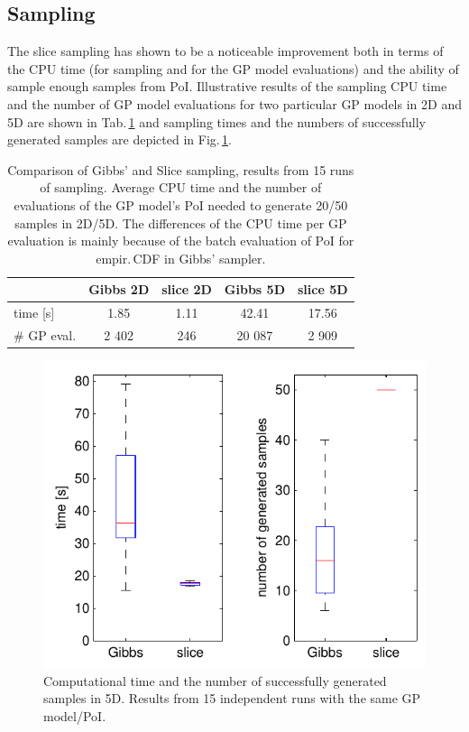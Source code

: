 \documentclass{itatnew}
\begin{document}
\subsection{Sampling}

The slice sampling has shown to be a noticeable improvement both in terms of the CPU time (for sampling and for the GP model evaluations) and the ability of sample enough samples from PoI. Illustrative results of the sampling CPU time and the number of GP model evaluations for two particular GP models in 2D and 5D are shown in Tab.\,\ref{tab:sampling} and sampling times and the numbers of successfully generated samples are depicted in Fig.\,\ref{fig:sampling}.

\begin{table}%
\begin{center}
{\small
\caption{Comparison of Gibbs' and Slice sampling, results from 15 runs of sampling. Average CPU time and the number of evaluations of the GP model's PoI needed to generate 20/50 samples in 2D/5D. The differences of the CPU time per GP evaluation is mainly because of the batch evaluation of PoI for empir.\,CDF in Gibbs' sampler.}
\vspace{1ex}
\label{tab:sampling}
\begin{tabular}{l | c c c c}
\hline
            & Gibbs 2D  & slice 2D      & Gibbs 5D      & slice 5D \\
\hline
time [s]    & 1.85      & 1.11          & 42.41         & 17.56 \\
\# GP eval. & 2 402     & 246           & 20 087        & 2 909 \\
\hline
\end{tabular}
} %
\end{center}
\end{table}

\begin{figure}
  \centering
  \includegraphics[width=0.7\linewidth]{sampling_time_popsize_5D}
  {\small
  \caption{Computational time and the number of successfully generated samples in 5D. Results from 15 independent runs with the same GP model/PoI.
  \label{fig:sampling}
  }
  }
\end{figure}
\end{document}

